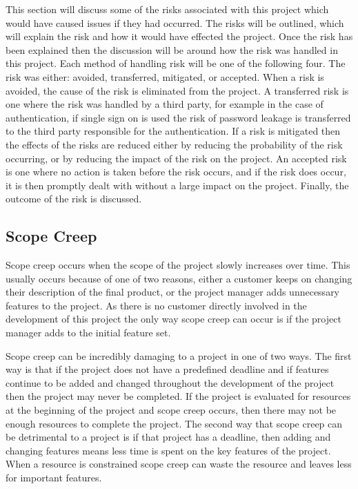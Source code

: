 \documentclass{article}
\begin{document}
This section will discuss some of the risks associated with this project which would have caused issues if they had occurred. The risks will be outlined, which will explain the risk and how it would have effected the project. Once the risk has been explained then the discussion will be around how the risk was handled in this project. Each method of handling risk will be one of the following four. The risk was either: avoided, transferred, mitigated, or accepted. When a risk is avoided, the cause of the risk is eliminated from the project. A transferred risk is one where the risk was handled by a third party, for example in the case of authentication, if single sign on is used the risk of password leakage is transferred to the third party responsible for the authentication. If a risk is mitigated then the effects of the risks are reduced either by reducing the probability of the risk occurring, or by reducing the impact of the risk on the project. An accepted risk is one where no action is taken before the risk occurs, and if the risk does occur, it is then promptly dealt with without a large impact on the project. Finally, the outcome of the risk is discussed. \par

\subsection{Scope Creep}

Scope creep occurs when the scope of the project slowly increases over time. This usually occurs because of one of two reasons, either a customer keeps on changing their description of the final product, or the project manager adds unnecessary features to the project. As there is no customer directly involved in the development of this project the only way scope creep can occur is if the project manager adds to the initial feature set. \par

Scope creep can be incredibly damaging to a project in one of two ways. The first way is that if the project does not have a predefined deadline and if features continue to be added and changed throughout the development of the project then the project may never be completed. If the project is evaluated for resources at the beginning of the project and scope creep occurs, then there may not be enough resources to complete the project. The second way that scope creep can be detrimental to a project is if that project has a deadline, then adding and changing features means less time is spent on the key features of the project. When a resource is constrained scope creep can waste the resource and leaves less for important features. \par
\end{document}
